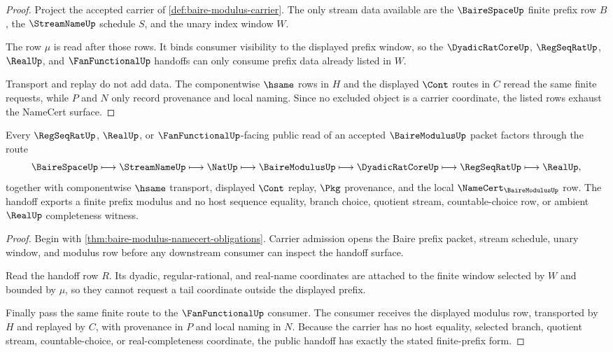 \begin{proof}
Project the accepted carrier of \autoref{def:baire-modulus-carrier}. The only stream data available are the $\BaireSpaceUp$ finite prefix row $B$, the $\StreamNameUp$ schedule $S$, and the unary index window $W$.

The row $\mu$ is read after those rows. It binds consumer visibility to the displayed prefix window, so the $\DyadicRatCoreUp$, $\RegSeqRatUp$, $\RealUp$, and $\FanFunctionalUp$ handoffs can only consume prefix data already listed in $W$.

Transport and replay do not add data. The componentwise $\hsame$ rows in $H$ and the displayed $\Cont$ routes in $C$ reread the same finite requests, while $P$ and $N$ only record provenance and local naming. Since no excluded object is a carrier coordinate, the listed rows exhaust the NameCert surface.
\end{proof}

\begin{theorem}
\label{thm:baire-modulus-prefix-handoff}
Every $\RegSeqRatUp$, $\RealUp$, or $\FanFunctionalUp$-facing public read of an accepted $\BaireModulusUp$ packet factors through the route
$$
\BaireSpaceUp \longmapsto \StreamNameUp \longmapsto \NatUp \longmapsto \BaireModulusUp \longmapsto \DyadicRatCoreUp \longmapsto \RegSeqRatUp \longmapsto \RealUp ,
$$
together with componentwise $\hsame$ transport, displayed $\Cont$ replay, $\Pkg$ provenance, and the local $\NameCert_{\BaireModulusUp}$ row. The handoff exports a finite prefix modulus and no host sequence equality, branch choice, quotient stream, countable-choice row, or ambient $\RealUp$ completeness witness.
\end{theorem}
\begin{proof}
Begin with \autoref{thm:baire-modulus-namecert-obligations}. Carrier admission opens the Baire prefix packet, stream schedule, unary window, and modulus row before any downstream consumer can inspect the handoff surface.

Read the handoff row $R$. Its dyadic, regular-rational, and real-name coordinates are attached to the finite window selected by $W$ and bounded by $\mu$, so they cannot request a tail coordinate outside the displayed prefix.

Finally pass the same finite route to the $\FanFunctionalUp$ consumer. The consumer receives the displayed modulus row, transported by $H$ and replayed by $C$, with provenance in $P$ and local naming in $N$. Because the carrier has no host equality, selected branch, quotient stream, countable-choice, or real-completeness coordinate, the public handoff has exactly the stated finite-prefix form.
\end{proof}


